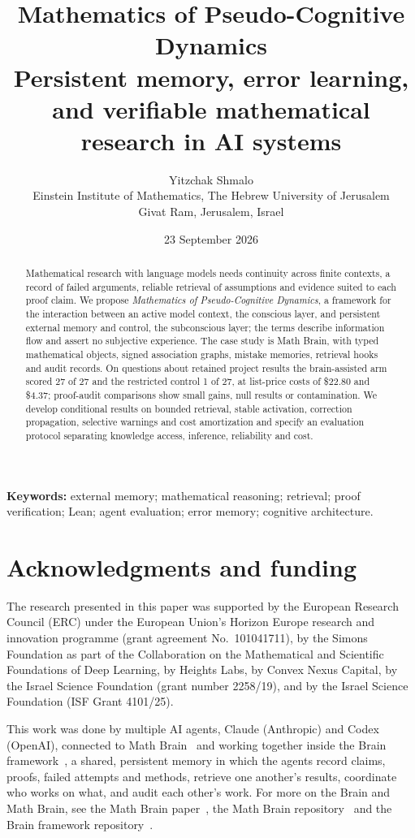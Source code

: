 \documentclass[11pt,letterpaper]{article}
\title{\textbf{Mathematics of Pseudo-Cognitive Dynamics}\\[0.55em]\large Persistent memory, error learning, and verifiable mathematical research in AI systems}
\author{Yitzchak Shmalo\\[0.4em]
\small Einstein Institute of Mathematics, The Hebrew University of Jerusalem\\
\small Givat Ram, Jerusalem, Israel}
\date{23 September 2026}
\begin{document}
\maketitle
\begin{abstract}
Mathematical research with language models needs continuity across finite contexts, a record of failed arguments, reliable retrieval of assumptions and evidence suited to each proof claim. We propose \emph{Mathematics of Pseudo-Cognitive Dynamics}, a framework for the interaction between an active model context, the conscious layer, and persistent external memory and control, the subconscious layer; the terms describe information flow and assert no subjective experience. The case study is Math Brain, with typed mathematical objects, signed association graphs, mistake memories, retrieval hooks and audit records. On questions about retained project results the brain-assisted arm scored 27 of 27 and the restricted control 1 of 27, at list-price costs of \$22.80 and \$4.37; proof-audit comparisons show small gains, null results or contamination. We develop conditional results on bounded retrieval, stable activation, correction propagation, selective warnings and cost amortization and specify an evaluation protocol separating knowledge access, inference, reliability and cost.
\end{abstract}
\noindent\textbf{Keywords:} external memory; mathematical reasoning; retrieval; proof verification; Lean; agent evaluation; error memory; cognitive architecture.
\tableofcontents
\newpage








\section*{Acknowledgments and funding}
The research presented in this paper was supported by the European Research Council (ERC) under the European Union's Horizon Europe research and innovation programme (grant agreement No.~101041711), by the Simons Foundation as part of the Collaboration on the Mathematical and Scientific Foundations of Deep Learning, by Heights Labs, by Convex Nexus Capital, by the Israel Science Foundation (grant number 2258/19), and by the Israel Science Foundation (ISF Grant 4101/25).

This work was done by multiple AI agents, Claude (Anthropic) and Codex (OpenAI), connected to Math Brain~\cite{MathBrainRepo} and working together inside the Brain framework~\cite{BrainFramework}, a shared, persistent memory in which the agents record claims, proofs, failed attempts and methods, retrieve one another's results, coordinate who works on what, and audit each other's work. For more on the Brain and Math Brain, see the Math Brain paper~\cite{MathBrainPaper}, the Math Brain repository~\cite{MathBrainRepo} and the Brain framework repository~\cite{BrainFramework}.
\end{document}
